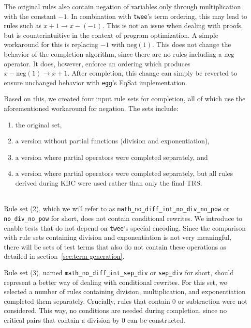The original rules also contain negation of variables only through multiplication with the constant $-1$. In combination with \texttt{twee}'s term ordering, this may lead to rules such as $x + 1 \to x - (-1)$. This is not an issue when dealing with proofs, but is counterintuitive in the context of program optimization. A simple workaround for this is replacing $-1$ with $\text{neg}(1)$. This does not change the behavior of the completion algorithm, since there are no rules including a $\text{neg}$ operator. It does, however, enforce an ordering which produces $x - \text{neg}(1) \to x + 1$. After completion, this change can simply be reverted to ensure unchanged behavior with \texttt{egg}'s EqSat implementation.

\noindent \begin{minipage}{\linewidth}
	Based on this, we created four input rule sets for completion, all of which use the aforementioned workaround for negation. The sets include:
	\begin{enumerate}
		\item the original set,
		\item a version without partial functions (division and exponentiation),
		\item a version where partial operators were completed separately, and
		\item a version where partial operators were completed separately, but all rules derived during KBC were used rather than only the final TRS.
	\end{enumerate}
\end{minipage}\\

Rule set (2), which we will refer to as \texttt{math\_no\_diff\_int\_no\_div\_no\_pow} or\\ \texttt{no\_div\_no\_pow} for short, does not contain conditional rewrites. We introduce to enable tests that do not depend on \texttt{twee}'s special encoding. Since the comparison with rule sets containing division and exponentiation is not very meaningful, there will be sets of test terms that also do not contain these operations as detailed in section~\ref{sec:term-generation}.

Rule set (3), named \texttt{math\_no\_diff\_int\_sep\_div} or \texttt{sep\_div} for short, should represent a better way of dealing with conditional rewrites. For this set, we selected a number of rules containing division, multiplication, and exponentiation completed them separately. Crucially, rules that contain $0$ or subtraction were not considered. This way, no conditions are needed during completion, since no critical pairs that contain a division by $0$ can be constructed.

